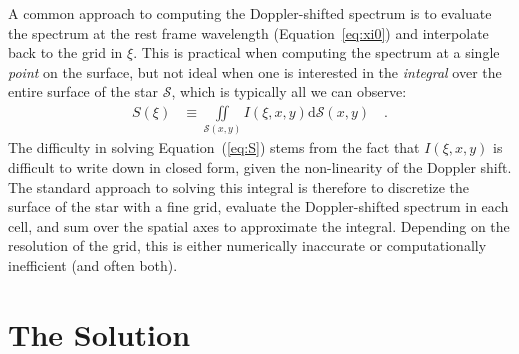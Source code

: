 \documentclass[modern]{aastex62}
\begin{document}
A common approach to computing the Doppler-shifted spectrum is to
evaluate the spectrum at the rest frame wavelength (Equation~\ref{eq:xi0})
and interpolate back to the grid in $\xi$. This is practical when
computing the spectrum at a single \emph{point} on the surface, but not
ideal when one is interested in the \emph{integral} over the entire
surface of the star $\mathcal{S}$, which is typically all we can observe:
%
\begin{align}
    \label{eq:S}
    S(\xi) 
        &\equiv
        \iint\limits_{\mathcal{S}(x, y)}
                I(\xi, x, y)
        \mathrm{d}{\mathcal{S}(x, y)}
        \quad .
\end{align}
%
The difficulty in solving Equation~(\ref{eq:S}) stems from the fact
that $I(\xi, x, y)$ is difficult to write down in closed form, given
the non-linearity of the Doppler shift.
The standard approach to solving this integral is therefore
to discretize the surface of the star with a fine grid, evaluate the
Doppler-shifted spectrum in each cell, and sum over the spatial axes
to approximate the integral. Depending on the resolution of the grid,
this is either numerically inaccurate or computationally inefficient 
(and often both).

\section{The Solution}
\end{document}
